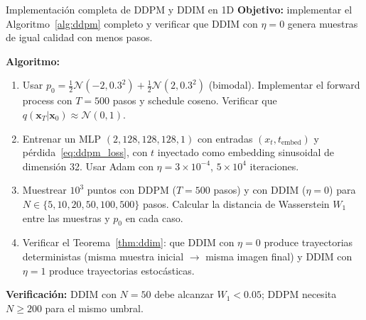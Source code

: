 \begin{ejerciciocomp}{Implementación completa de DDPM y DDIM en 1D}
\textbf{Objetivo:} implementar el Algoritmo~\ref{alg:ddpm} completo y verificar
que DDIM con $\eta=0$ genera muestras de igual calidad con menos pasos.

\medskip\noindent\textbf{Algoritmo:}
\begin{enumerate}
  \item Usar $p_0 = \frac{1}{2}\mathcal{N}(-2,0.3^2)+\frac{1}{2}\mathcal{N}(2,0.3^2)$
        (bimodal). Implementar el forward process con $T=500$ pasos y schedule
        coseno. Verificar que $q(\bm{x}_T|\bm{x}_0)\approx\mathcal{N}(0,1)$.
  \item Entrenar un MLP $(2, 128, 128, 128, 1)$ con entradas $(x_t, t_{\mathrm{embed}})$
        y pérdida~\eqref{eq:ddpm_loss}, con $t$ inyectado como embedding
        sinusoidal de dimensión 32. Usar Adam con $\eta=3\times10^{-4}$,
        $5\times10^4$ iteraciones.
  \item Muestrear $10^3$ puntos con DDPM ($T=500$ pasos) y con DDIM ($\eta=0$)
        para $N\in\{5,10,20,50,100,500\}$ pasos. Calcular la distancia de
        Wasserstein $W_1$ entre las muestras y $p_0$ en cada caso.
  \item Verificar el Teorema~\ref{thm:ddim}: que DDIM con $\eta=0$ produce
        trayectorias deterministas (misma muestra inicial $\to$ misma imagen
        final) y DDIM con $\eta=1$ produce trayectorias estocásticas.
\end{enumerate}
\medskip\noindent\textbf{Verificación:} DDIM con $N=50$ debe alcanzar
$W_1 < 0.05$; DDPM necesita $N\geq 200$ para el mismo umbral.
\end{ejerciciocomp}

